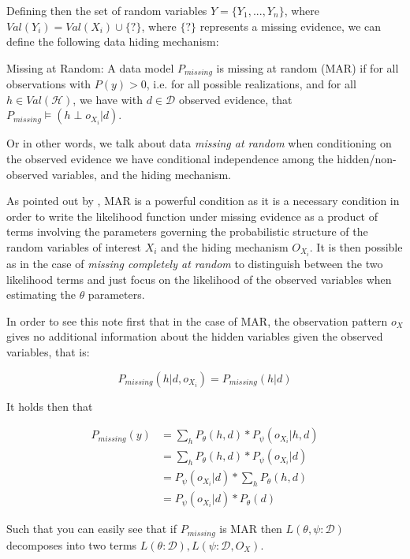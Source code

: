 \documentclass[11pt]{article}
\begin{document}
\begin{article}
Defining then the set of random variables \(Y = \{Y_1, . . . , Y_n\}\),
where \(Val(Y_i) = Val(X_i) \cup \{?\}\), where \(\{?\}\) represents a
missing evidence, we can define the following data hiding mechanism:

\begin{definition}
Missing at Random: A data model $P_{missing}$ is missing at random (MAR)
if for all observations with $P(y) > 0$, i.e. for all possible realizations,
and for all $h \in Val(\mathscr{H})$, we have with $d \in \mathscr{D}$
observed evidence, that $ P_{missing} \models (h \perp o_{X_i} | d) $.
\end{definition}  

Or in other words, we talk about data \emph{missing at random} when
conditioning on the observed evidence we have conditional
independence among the hidden/non-observed variables, and the
hiding mechanism.

As pointed out by \cite{koller2009probabilistic}, MAR is a powerful
condition as it is a necessary condition in order to write the
likelihood function under missing evidence as a product of terms
involving the parameters governing the probabilistic structure of
the random variables of interest \(X_i\) and the hiding mechanism
\(O_{X_i}\). It is then possible as in the case of \emph{missing completely
at random} to distinguish between the two likelihood terms and just
focus on the likelihood of the observed variables when estimating
the \(\theta\) parameters.

In order to see this note first that in the case of MAR, the
observation pattern \(o_X\) gives no additional information about the
hidden variables given the observed variables, that is:

$$ P_{missing} (h | d, o_{X_i}) =  P_{missing} (h | d) $$

It holds then that 


\begin{align}
P_{missing}(y) &= \sum_h P_{\theta} (h, d) * P_\psi(o_{X_i} | h, d) \nonumber \\
             &= \sum_h P_{\theta} (h, d) * P_\psi(o_{X_i} | d) \nonumber \\
             &= P_\psi(o_{X_i} | d) * \sum_h P_{\theta} (h, d)  \nonumber \\
	     &= P_\psi(o_{X_i} | d) * P_{\theta} (d)  \nonumber		
\end{align}

Such that you can easily see that if \(P_{missing}\) is MAR then
\(L(\theta, \psi : \mathscr{D})\) decomposes into two terms \(L(\theta :
   \mathscr{D}), L(\psi : \mathscr{D}, O_X)\).


\end{article}
\end{document}
